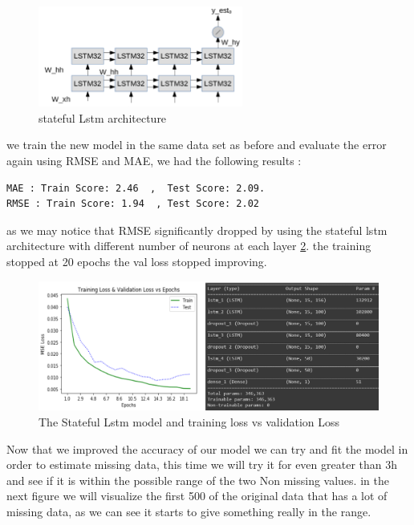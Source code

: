 \begin{figure}[h]
\centering
\includegraphics[width=0.6\textwidth]{img/stateful_stacked_lstm.png}  
\caption{stateful Lstm  architecture \cite{keras2015}}
\label{}
\end{figure}
we train the new model in the same data set as before and evaluate the error again using RMSE and MAE, we had the following results :
\begin{verbatim}
MAE : Train Score: 2.46  ,  Test Score: 2.09.
RMSE : Train Score: 1.94  , Test Score: 2.02 
\end{verbatim}
as we may notice that RMSE significantly dropped by using the stateful lstm architecture with different  number of neurons at each layer \ref{stat_lstm}. the training stopped at 20 epochs the val loss stopped improving.
\begin{figure}[!h]
\centering
\includegraphics[width=1.06\textwidth]{img/lstm_stateful.png}  
\caption{The Stateful Lstm model and training loss vs validation Loss }
\label{stat_lstm}
\end{figure}
Now that we improved the accuracy of our model we can try and fit the model in order to estimate missing data, this time we will try it for even greater than 3h and see if it is within the possible range of the two Non missing values.
in the next figure we will visualize the first 500 of the original data that has a lot of missing data, as we can see it starts to give something really in the range.


